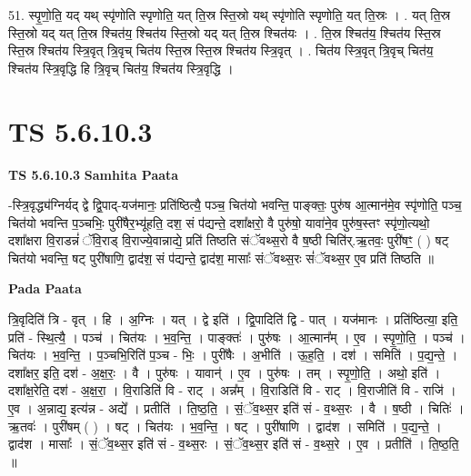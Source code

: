 \documentclass[17pt]{extarticle}
\begin{document}
51. स्पृ॒णो॒ति॒ यद् यथ् स्पृ॑णोति स्पृणोति॒ यत् ति॒स्र स्ति॒स्रो यथ् स्पृ॑णोति स्पृणोति॒ यत् ति॒स्रः । . यत् ति॒स्र स्ति॒स्रो यद् यत् ति॒स्र श्चित॑य॒ श्चित॑य स्ति॒स्रो यद् यत् ति॒स्र श्चित॑यः । . ति॒स्र श्चित॑य॒ श्चित॑य स्ति॒स्र स्ति॒स्र श्चित॑य स्त्रि॒वृत् त्रि॒वृच् चित॑य स्ति॒स्र स्ति॒स्र श्चित॑य स्त्रि॒वृत् । . चित॑य स्त्रि॒वृत् त्रि॒वृच् चित॑य॒ श्चित॑य स्त्रि॒वृद्धि हि त्रि॒वृच् चित॑य॒ श्चित॑य स्त्रि॒वृद्धि । \newline
\pagebreak
{}

\section{ TS 5.6.10.3 }

\textbf{TS 5.6.10.3 } \newline
\textbf{Samhita Paata} \newline

-स्त्रि॒वृद्ध्य॑ग्निर्यद् द्वे द्वि॒पाद्-यज॑मानः॒ प्रति॑ष्ठित्यै॒ पञ्च॒ चित॑यो भवन्ति॒ पाङ्क्तः॒ पुरु॑ष आ॒त्मान॑मे॒व स्पृ॑णोति॒ पञ्च॒ चित॑यो भवन्ति प॒ञ्चभिः॒ पुरी॑षैर॒भ्यू॑हति॒ दश॒ सं प॑द्यन्ते॒ दशा᳚क्षरो॒ वै पुरु॑षो॒ यावा॑ने॒व पुरु॑ष॒स्तꣳ स्पृ॑णो॒त्यथो॒ दशा᳚क्षरा वि॒राडन्नं॑ ॅवि॒राड् वि॒राज्ये॒वान्नाद्ये॒ प्रति॑ तिष्ठति संॅवथ्स॒रो वै ष॒ष्ठी चिति॑र्.ऋ॒तवः॒ पुरी॑षꣳ॒॒ ( ) षट् चित॑यो भवन्ति॒ षट् पुरी॑षाणि॒ द्वाद॑श॒ सं प॑द्यन्ते॒ द्वाद॑श॒ मासाः᳚ संॅवथ्स॒रः सं॑ॅवथ्स॒र ए॒व प्रति॑ तिष्ठति ॥ \newline

\textbf{Pada Paata} \newline

त्रि॒वृदिति॑ त्रि - वृत् । हि । अ॒ग्निः । यत् । द्वे इति॑ । द्वि॒पादिति॑ द्वि - पात् । यज॑मानः । प्रति॑ष्ठित्या॒ इति॒ प्रति॑ - स्थि॒त्यै॒ । पञ्च॑ । चित॑यः । भ॒व॒न्ति॒ । पाङ्क्तः॑ । पुरु॑षः । आ॒त्मान᳚म् । ए॒व । स्पृ॒णो॒ति॒ । पञ्च॑ । चित॑यः । भ॒व॒न्ति॒ । प॒ञ्चभि॒रिति॑ प॒ञ्च - भिः॒ । पुरी॑षैः । अ॒भीति॑ । ऊ॒ह॒ति॒ । दश॑ । समिति॑ । प॒द्य॒न्ते॒ । दशा᳚क्षर॒ इति॒ दश॑ - अ॒क्ष॒रः॒ । वै । पुरु॑षः । यावान्॑ । ए॒व । पुरु॑षः । तम् । स्पृ॒णो॒ति॒ । अथो॒ इति॑ । दशा᳚क्ष॒रेति॒ दश॑ - अ॒क्ष॒रा॒ । वि॒राडिति॑ वि - राट् । अन्न᳚म् । वि॒राडिति॑ वि - राट् । वि॒राजीति॑ वि - राजि॑ । ए॒व । अ॒न्नाद्य॒ इत्य॑न्न - अद्ये᳚ । प्रतीति॑ । ति॒ष्ठ॒ति॒ । सं॒ॅव॒थ्स॒र इति॑ सं - व॒थ्स॒रः । वै । ष॒ष्ठी । चितिः॑ । ऋ॒तवः॑ । पुरी॑षम् ( ) । षट् । चित॑यः । भ॒व॒न्ति॒ । षट् । पुरी॑षाणि । द्वाद॑श । समिति॑ । प॒द्य॒न्ते॒ । द्वाद॑श । मासाः᳚ । सं॒ॅव॒थ्स॒र इति॑ सं - व॒थ्स॒रः । सं॒ॅव॒थ्स॒र इति॑ सं - व॒थ्स॒रे । ए॒व । प्रतीति॑ । ति॒ष्ठ॒ति॒ ॥  \newline
\end{document}
